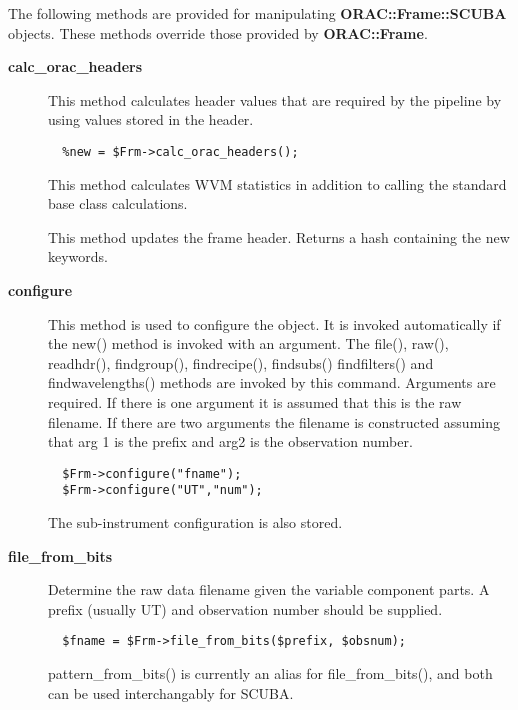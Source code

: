 \begin{description}
\begin{description}
The following methods are provided for manipulating
\textbf{ORAC::Frame::SCUBA} objects. These methods override those
provided by \textbf{ORAC::Frame}.

\begin{description}

\item[{\textbf{calc\_orac\_headers}}] \mbox{}

This method calculates header values that are required by the
pipeline by using values stored in the header.

\begin{verbatim}
  %new = $Frm->calc_orac_headers();
\end{verbatim}


This method calculates WVM statistics in addition to calling
the standard base class calculations.



This method updates the frame header.
Returns a hash containing the new keywords.


\item[{\textbf{configure}}] \mbox{}

This method is used to configure the object. It is invoked
automatically if the new() method is invoked with an argument. The
file(), raw(), readhdr(), findgroup(), findrecipe(), findsubs() 
findfilters() and findwavelengths() methods are
invoked by this command. Arguments are required.
If there is one argument it is assumed that this is the
raw filename. If there are two arguments the filename is
constructed assuming that arg 1 is the prefix and arg2 is the
observation number.

\begin{verbatim}
  $Frm->configure("fname");
  $Frm->configure("UT","num");
\end{verbatim}


The sub-instrument configuration is also stored.


\item[{\textbf{file\_from\_bits}}] \mbox{}

Determine the raw data filename given the variable component
parts. A prefix (usually UT) and observation number should
be supplied.

\begin{verbatim}
  $fname = $Frm->file_from_bits($prefix, $obsnum);
\end{verbatim}


pattern\_from\_bits() is currently an alias for file\_from\_bits(),
and both can be used interchangably for SCUBA.



\end{description}
\end{description}
\end{description}
